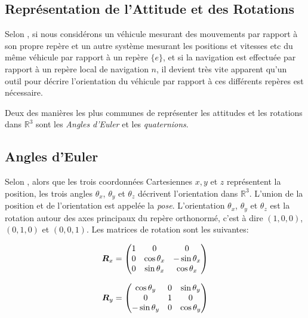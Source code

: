 \documentclass[12pt,a4paper]{report}
\begin{document}
\begin{appendix}
	\chapter{Représentation de l'Attitude et des Rotations}
	Selon \cite{gustavsson_uav_2015}, si nous considérons un véhicule mesurant des mouvements par rapport à son propre repère et un autre système mesurant les positions et vitesses etc du même véhicule par rapport à un repère $\{e\}$, et si la navigation est effectuée par rapport à un repère local de navigation ${n}$, il devient très vite apparent qu'un outil pour décrire l'orientation du véhicule par rapport à ces différents repères est nécessaire.
	
	\para Deux des manières les plus communes de représenter les attitudes et les rotations dans $\mathbb{R}^3$ sont les \textit{Angles d'Euler} et les \textit{quaternions}.
		\section{Angles d'Euler}
		Selon \cite{nuchter_3d_2009}, alors que les trois coordonnées Cartesiennes $x,y$ et $z$ représentent la position, les trois angles $\theta_x$, $\theta_y$ et $\theta_z$ décrivent l'orientation dans $\mathbb{R}^3$. L'union de la position et de l'orientation est appelée la \textit{pose}. L'orientation $\theta_x$, $\theta_y$ et $\theta_z$ est la rotation autour des axes principaux du repère orthonormé, c'est à dire $(1,0,0)$, $(0,1,0)$ et $(0,0,1)$. Les matrices de rotation sont les suivantes:
		
		\begin{equation*}
		\boldsymbol{R}_x =	\begin{pmatrix}
		1 & 0 & 0 \\
		0 & \cos{\theta_x} & -\sin{\theta_x}\\
		0 & \sin{\theta_x} & \cos{\theta_x}
		
		\end{pmatrix}
		\end{equation*}
		
		\begin{equation*}
		\boldsymbol{R}_y = \begin{pmatrix}
		\cos{\theta_y} & 0 & \sin{\theta_y}\\
		0 & 1 & 0 \\
		-\sin{\theta_y} &  0 & \cos{\theta_y}
		\end{pmatrix}
		\end{equation*}
		

\end{appendix}
\end{document}
